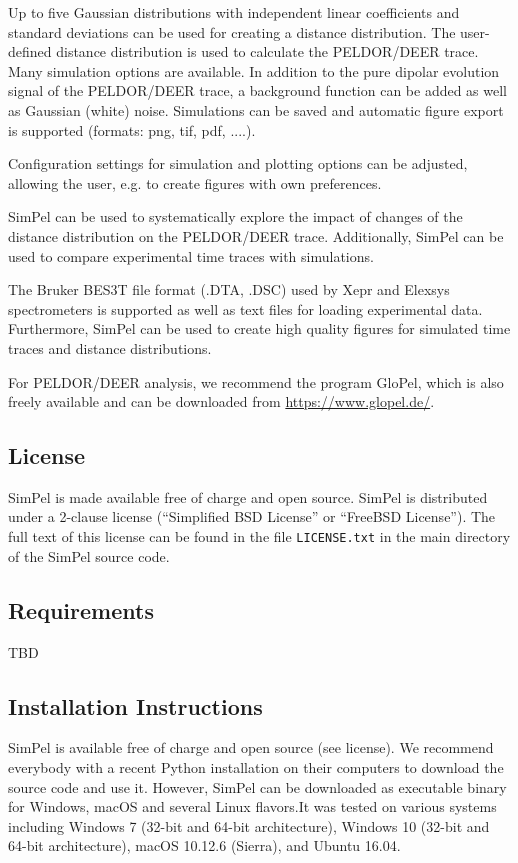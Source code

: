 \documentclass[pdftex,bezier,german,a4,twoside, headexclude,12pt,nochapterprefix, titlepage]{extarticle}
\newcommand{\simpel}{\textsf{SimPel}}
\begin{document}
Up to five Gaussian distributions with independent linear coefficients and standard deviations can be used for creating a distance distribution. The user-defined distance distribution is used to calculate the PELDOR/DEER trace. Many simulation options are available. In addition to the pure dipolar evolution signal of the PELDOR/DEER trace, a background function can be added as well as Gaussian (white) noise. Simulations can be saved and automatic figure export is supported (formats: png, tif, pdf, ....).

Configuration settings for simulation and plotting options can be adjusted, allowing the user, e.g. to create figures with own preferences.

\simpel{} can be used to systematically explore the impact of changes of the distance distribution on the PELDOR/DEER trace. Additionally, \simpel{} can be used to compare experimental time traces with simulations.

The Bruker BES3T file format (.DTA, .DSC) used by Xepr and Elexsys spectrometers
is supported as well as text files for loading experimental data. Furthermore, \simpel{} can be used to create high quality figures for simulated time traces and distance distributions.

For PELDOR/DEER analysis, we recommend the program GloPel, which is also freely available and can be downloaded from \url{https://www.glopel.de/}.

\subsection{License}

\simpel{} is made available free of charge and open source. 
\simpel{} is distributed under a 2-clause license (``Simplified BSD License'' or ``FreeBSD License''). The full text of this license can be found in the file \texttt{LICENSE.txt} in the main directory of the \simpel{} source code.


\subsection{Requirements}

TBD


\subsection{Installation Instructions}

\simpel{} is available free of charge and open source (see license). We recommend everybody with a recent Python installation on their computers to download the source code and use it. However, \simpel{} can be downloaded as executable binary for Windows, macOS and several Linux flavors.It was tested on various systems including Windows 7 (32-bit and 64-bit architecture), Windows 10 (32-bit and 64-bit architecture), macOS 10.12.6 (Sierra), and Ubuntu 16.04.
\end{document}
